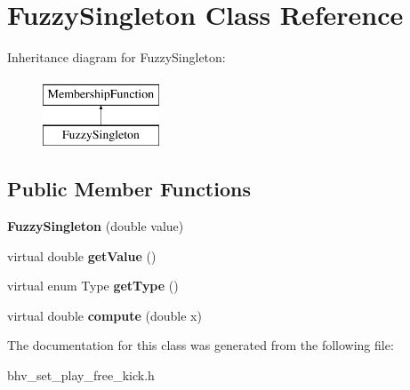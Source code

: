 \hypertarget{classFuzzySingleton}{
\section{FuzzySingleton Class Reference}
\label{classFuzzySingleton}
}
Inheritance diagram for FuzzySingleton:\begin{figure}[H]
\begin{center}
\leavevmode
\includegraphics[height=2.000000cm]{classFuzzySingleton}
\end{center}
\end{figure}
\subsection*{Public Member Functions}
\begin{DoxyCompactItemize}
\item 
\hypertarget{classFuzzySingleton_a054ad23c7b7b963808855ea99c453221}{
{\bfseries FuzzySingleton} (double value)}
\label{classFuzzySingleton_a054ad23c7b7b963808855ea99c453221}

\item 
\hypertarget{classFuzzySingleton_a9f582604d8dd3e84b9aa34192826ddea}{
virtual double {\bfseries getValue} ()}
\label{classFuzzySingleton_a9f582604d8dd3e84b9aa34192826ddea}

\item 
\hypertarget{classFuzzySingleton_a16cef20b291126c5d482a0457102f390}{
virtual enum Type {\bfseries getType} ()}
\label{classFuzzySingleton_a16cef20b291126c5d482a0457102f390}

\item 
\hypertarget{classFuzzySingleton_a316f3c2780c0cb86f556b587bbbdc511}{
virtual double {\bfseries compute} (double x)}
\label{classFuzzySingleton_a316f3c2780c0cb86f556b587bbbdc511}

\end{DoxyCompactItemize}


The documentation for this class was generated from the following file:\begin{DoxyCompactItemize}
\item 
bhv\_\-set\_\-play\_\-free\_\-kick.h\end{DoxyCompactItemize}
